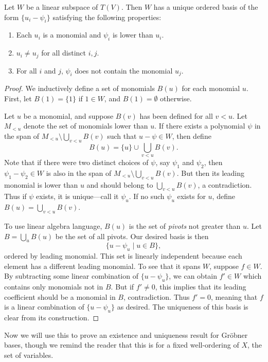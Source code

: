 \begin{prop}\label{prop:rref}
	Let $W$ be a linear subspace of $T(V)$. Then $W$ has a unique ordered basis of the form $\{u_i - \psi_i\}$ satisfying the following properties:
	\begin{enumerate}
		\item Each $u_i$ is a monomial and $\psi_i$ is lower than $u_i$.
		\item $u_i \neq u_j$ for all distinct $i,j$.
		\item For all $i$ and $j$, $\psi_i$ does not contain the monomial $u_j$.
	\end{enumerate}
\end{prop}
\begin{proof}
	We inductively define a set of monomials $B(u)$ for each monomial $u$. First, let $B(1) = \{1\}$ if $1 \in W$, and $B(1) = \emptyset$ otherwise.
	
	Let $u$ be a monomial, and suppose $B(v)$ has been defined for all $v < u$. Let $M_{<u}$ denote the set of monomials lower than $u$. If there exists a polynomial $\psi$ in the span of $M_{<u} \setminus \bigcup_{v<u} B(v)$ such that $u - \psi \in W$, then define
	\[
		B(u) = \{u\} \cup \bigcup_{v<u} B(v).
	\]
	Note that if there were two distinct choices of $\psi$, say $\psi_1$ and $\psi_2$, then $\psi_1 - \psi_2 \in W$ is also in the span of $M_{<u} \setminus \bigcup_{v<u} B(v)$. But then its leading monomial is lower than $u$ and should belong to $\bigcup_{v<u} B(v)$, a contradiction. Thus if $\psi$ exists, it is unique---call it $\psi_u$. If no such $\psi_u$ exists for $u$, define $B(u) = \bigcup_{v<u} B(v)$.
	
	To use linear algebra language, $B(u)$ is the set of \emph{pivots} not greater than $u$. Let $B = \bigcup_u B(u)$ be the set of all pivots. Our desired basis is then
	\[
		\{u - \psi_u \mid u \in B\},
	\]
	ordered by leading monomial. This set is linearly independent because each element has a different leading monomial. To see that it spans $W$, suppose $f\in W$. By subtracting some linear combination of $\{u - \psi_u\}$, we can obtain $f' \in W$ which contains only monomials not in $B$. But if $f' \neq 0$, this implies that its leading coefficient should be a monomial in $B$, contradiction. Thus $f' = 0$, meaning that $f$ is a linear combination of $\{u - \psi_u\}$ as desired. The uniqueness of this basis is clear from its construction.
\end{proof}
Now we will use this to prove an existence and uniqueness result for Gr\"obner bases, though we remind the reader that this is for a fixed well-ordering of $X$, the set of variables.
